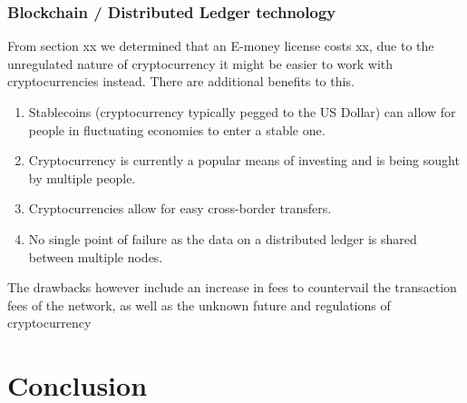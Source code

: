 \documentclass[11pt, a4paper]{article}
\begin{document}
\subsubsection{Blockchain / Distributed Ledger technology} %

\label{sub:blockchain_technology}

From {\color{red} section xx} we determined that an E-money license costs {\color{red} xx}, due to the unregulated nature of cryptocurrency it might be easier to work with cryptocurrencies instead. There are additional benefits to this.
\begin{enumerate}
    \item Stablecoins (cryptocurrency typically pegged to the US Dollar) can allow for people in fluctuating economies to enter a stable one.
    \item Cryptocurrency is currently a popular means of investing and is being sought by multiple people.
    \item Cryptocurrencies allow for easy cross-border transfers.
    \item No single point of failure as the data on a distributed ledger is shared between multiple nodes.
\end{enumerate}
The drawbacks however include an increase in fees to countervail the transaction fees of the network, as well as the unknown future and regulations of cryptocurrency

\section{Conclusion}

\begingroup
\let\cleardoublepage\clearpage
{}


\endgroup
\end{document}
